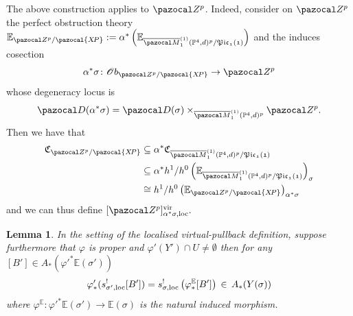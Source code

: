 \documentclass[11pt]{amsart}
\newcommand{\Mone}[3]{\overline{\pazocal M}^{(1)}_{#1}(#2,#3)}
\newcommand{\PP}{\mathbb P}
\newcommand{\OO}{\mathcal O}
\renewcommand{\to}{\rightarrow}
\newcommand{\XP}{\pazocal{X\!P}}
\newcommand{\Z}{\pazocal Z}
\theoremstyle{plain}
\newtheorem{lem}[thm]{Lemma}
\theoremstyle{definition}
\begin{document}
The above construction applies to $\Z^p$.
Indeed, consider on $\Z^p$ the perfect obstruction theory $\mathbb E_{\Z^p/\XP}:=\alpha^*\left(\mathbb E_{\Mone{1}{\PP^4}{d}^p/\mathfrak{Pic_1{(1)}}}\right)$ and the induces cosection
\[\alpha^*\sigma\colon \OO b_{\Z^p/\XP}\to \Z^p\]
whose degeneracy locus is
\[\pazocal D(\alpha^*\sigma)=\pazocal D(\sigma)\times_{\Mone{1}{\PP^4}{d}^p} \Z^p.\]
Then we have that
\begin{align*}
\mathfrak C_{\Z^p/\XP}& \subseteq \alpha^*\mathfrak C_{\Mone{1}{\PP^4}{d}^p/\mathfrak{Pic_1{(1)}}}\\
& \subseteq \alpha^* h^1/h^0\left(\mathbb E_{\Mone{1}{\PP^4}{d}^p/\mathfrak{Pic_1{(1)}}}\right)_\sigma\\
&\cong h^1/h^0\left(\mathbb E_{\Z^p/\XP}\right)_{\alpha^*\sigma}
\end{align*}
and we can thus define $[\Z^p]^{\rm{vir}}_{\alpha^*\sigma,\rm{loc}}.$
\begin{lem}\label{lem:comutativity}
In the setting of the localised virtual-pullback definition, suppose furthermore that $\varphi$ is proper and $\varphi'(Y')\cap U\neq\emptyset$ then
for any $[B']\in A_*(\varphi'^*\mathbb{E}(\sigma'))$
\begin{equation}\label{eq:commcos}\varphi'_*( s^!_{\sigma',\rm{loc}}[B'])=s^!_{\sigma,\rm{loc}}\left(\varphi^{\mathbb{E}}_*[B']\right)\,\in\, A_*(Y(\sigma)) 
\end{equation}
where $\varphi^{\mathbb{E}}\colon \varphi'^*\mathbb{E}(\sigma')\to \mathbb{E}(\sigma)$ is the natural induced morphism.
\end{lem}
\end{document}
